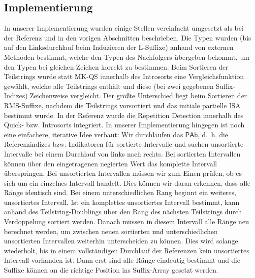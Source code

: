 \subsection{Implementierung}

In unserer Implementierung wurden einige Stellen vereinfacht umgesetzt als bei der Referenz und in den vorigen Abschnitten beschrieben. Die Typen wurden (bis auf den Linksdurchlauf beim Induzieren der L-Suffixe) anhand von externen Methoden bestimmt, welche den Typen des Nachfolgers übergeben bekommt, um den Typen bei gleichen Zeichen korrekt zu bestimmen. Beim Sortieren der Teilstrings wurde statt MK-QS innerhalb des Introsorts eine Vergleichsfunktion gewählt, welche alle Teilstrings enthält und diese (bei zwei gegebenen Suffix-Indizes) Zeichenweise vergleicht. 
Der größte Unterschied liegt beim Sortieren der RMS-Suffixe, nachdem die Teilstrings vorsortiert und das initiale partielle ISA bestimmt wurde. In der Referenz wurde die Repetition Detection innerhalb des Quick- bzw. Introsorts integriert. In unserer Implementierung hingegen ist noch eine einfachere, iterative Idee verbaut: Wir durchlaufen das $\mathsf{PAb}$, d.~h. die Referenzindizes bzw. Indikatoren für sortierte Intervalle und suchen unsortierte Intervalle bei einem Durchlauf von links nach rechts. Bei sortierten Intervallen können über den eingetragenen negierten Wert das komplette Intervall überspringen. Bei unsortierten Intervallen müssen wir zum Einen prüfen, ob es sich um ein einzelnes Intervall handelt. Dies können wir daran erkennen, dass alle Ränge identisch sind. Bei einem unterschiedlichen Rang beginnt ein weiteres, unsortiertes Intervall. Ist ein komplettes unsortiertes Intervall bestimmt, kann anhand des Teilstring-Doublings über den Rang des nächsten Teilstrings durch Verdoppelung sortiert werden. Danach müssen in diesem Intervall alle Ränge neu berechnet werden, um zwischen neuen sortierten und unterschiedlichen unsortierten Intervallen weiterhin unterscheiden zu können. Dies wird solange wiederholt, bis in einem vollständigen Durchlauf der Referenzen kein unsortiertes Intervall vorhanden ist. Dann erst sind alle Ränge eindeutig bestimmt und die Suffixe können an die richtige Position ins Suffix-Array gesetzt werden.
